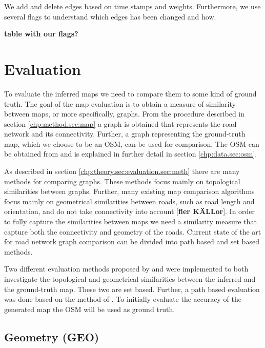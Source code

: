 We add and delete edges based on time stamps and weights. Furthermore, we use several flags to understand which edges has been changed and how. 

\textbf{table with our flags?}


\section{Evaluation}
\label{chp:method.sec:evaluation}

To evaluate the inferred maps we need to compare them to some kind of ground truth. The goal of the map evaluation is to obtain a measure of similarity between maps, or more specifically, graphs. From the procedure described in section \ref{chp:method.sec:map} a graph is obtained that represents the road network and its connectivity. Further, a graph representing the ground-truth map, which we choose to be an \ac{OSM}, can be used for comparison. The \ac{OSM} can be obtained from \citep{osm} and is explained in further detail in section \ref{chp:data.sec:osm}.

As described in section \ref{chp:theory.sec:evaluation.sec:meth} there are many methods for comparing graphs. These methods focus mainly on topological similarities between graphs. Further, many existing map comparison algorithms focus mainly on geometrical similarities between roads, such as road length and orientation, and do not take connectivity into account \citep{ming}[\textbf{fler KÄLLor}]. In order to fully capture the similarities between maps we need a similarity measure that capture both the connectivity and geometry of the roads. Current state of the art for road network graph comparison can be divided into path based and set based methods.

Two different evaluation methods proposed by \cite{4inBiagioni} and \cite{biagioni:gis12} were implemented to both investigate the topological and geometrical similarities between the inferred and the ground-truth map. These two are set based. Further, a path based evaluation was done based on the method of \cite{pathbased}. To initially evaluate the accuracy of the generated map the \ac{OSM} will be used as ground truth. 

\subsection{Geometry (GEO)}
\label{chp:method.sec:evaluation.sub:geom}

